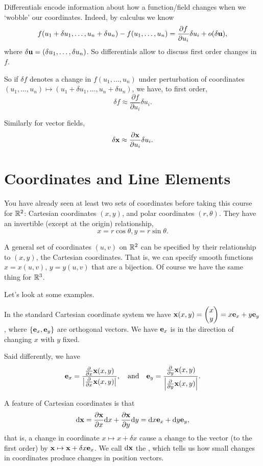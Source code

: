 \documentclass[a4paper]{scrreprt}
\begin{document}
Differentials encode information about how a function/field changes when we `wobble' our coordinates. Indeed, by calculus we know
$$
f(u_1 + \delta u_1, \dots, u_n + \delta u_n) - f(u_1, \dots, u_n) = \frac{\partial f}{\partial u_i} \delta u_i + o(\delta \mathbf{u}),
$$
where $\delta\mathbf{u} = (\delta u_1, \dots, \delta u_n)$. So differentials allow to discuss first order changes in $f$.

So if $\delta f$ denotes a change in $f(u_1, \dots, u_n)$ under perturbation of coordinates $(u_1, \dots, u_n) \mapsto (u_1 + \delta u_1, \dots, u_n + \delta u_n)$,  we have, to first order,
$$
\delta f \approx \frac{\partial f}{\partial u_i} \delta u_i.
$$

Similarly for vector fields,
$$
\delta \mathbf{x} \approx \frac{\partial \mathbf{x}}{\partial u_i} \delta u_i.
$$

\section{Coordinates and Line Elements}

You have already seen at least two sets of coordinates before taking this course for $\mathbb{R}^2$: Cartesian coordinates $(x, y)$, and polar coordinates $(r, \theta)$. They have an invertible (except at the origin) relationship,
$$
x = r \cos \theta, y = r \sin \theta.
$$


A general set of coordinates $(u, v)$ on $\mathbb{R}^2$ can be specified by their relationship to $(x, y)$, the Cartesian coordinates. That is, we can specify smooth functions $x = x(u, v)$, $y = y(u, v)$ that are a bijection. Of course we have the same thing for $\mathbb{R}^3$.

Let's look at some examples.

\begin{example}
In the standard Cartesian coordinate system we have $\mathbf{x}(x, y) = \begin{pmatrix}
	x \\ y
\end{pmatrix} = x \mathbf{e}_x + y \mathbf{e}_y$, where $\{\mathbf{e}_x, \mathbf{e}_y\}$ are orthogonal vectors. We have $\mathbf{e}_x$ is in the direction of changing $x$ with $y$ fixed.

Said differently, we have 
$$\mathbf{e}_x = \frac{\frac{\partial}{\partial x} \mathbf{x}(x, y)}{\left|\frac{\partial}{\partial x} \mathbf{x}(x, y)\right|}, \quad \text{and} \quad \mathbf{e}_y = \frac{\frac{\partial}{\partial y} \mathbf{x}(x, y)}{\left|\frac{\partial}{\partial y} \mathbf{x}(x, y)\right|}.$$

A feature of Cartesian coordinates is that
$$
\mathrm{d} \mathbf{x} = \frac{\partial \mathbf{x}}{\partial x} \mathrm{d} x + \frac{\partial \mathbf{x}}{\partial y} \mathrm{d} y = \mathrm{d} x \mathbf{e}_x + \mathrm{d} y \mathbf{e}_y,
$$
that is, a change in coordinate $x \mapsto x + \delta x$ cause a change to the vector (to the first order) by $\mathbf{x} \mapsto \mathbf{x} + \delta x \mathbf{e}_x$. We call $\mathrm{d} \mathbf{x}$ the , which tells us how small changes in coordinates produce changes in position vectors.
\end{example}
\end{document}
